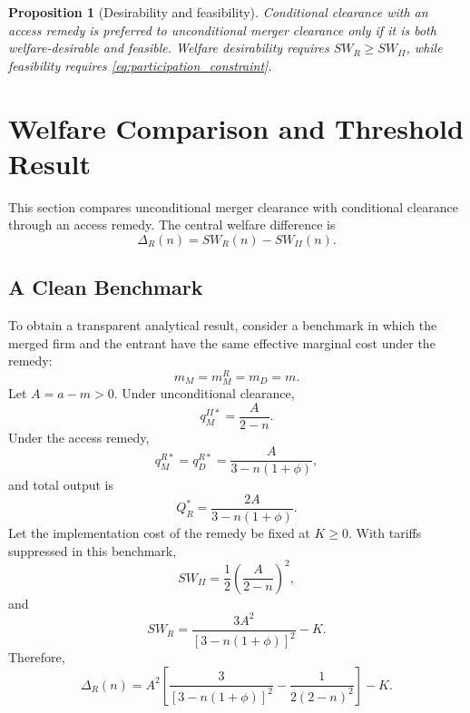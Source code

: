 \documentclass[12pt]{article}
\newtheorem{proposition}{Proposition}
\begin{document}
\begin{proposition}[Desirability and feasibility]
Conditional clearance with an access remedy is preferred to unconditional merger clearance only if it is both welfare-desirable and feasible. Welfare desirability requires $SW_R\geq SW_{II}$, while feasibility requires \eqref{eq:participation_constraint}.
\end{proposition}

\section{Welfare Comparison and Threshold Result}\label{sec:threshold}

This section compares unconditional merger clearance with conditional clearance through an access remedy. The central welfare difference is
\begin{equation}
\Delta_R(n)=SW_R(n)-SW_{II}(n).
\label{eq:Delta_definition_clean}
\end{equation}

\subsection{A Clean Benchmark}

To obtain a transparent analytical result, consider a benchmark in which the merged firm and the entrant have the same effective marginal cost under the remedy:
\begin{equation}
m_M=m_M^R=m_D=m.
\end{equation}
Let $A=a-m>0$. Under unconditional clearance,
\begin{equation}
q_M^{II*}=\frac{A}{2-n}.
\label{eq:qII_clean_benchmark}
\end{equation}
Under the access remedy,
\begin{equation}
q_M^{R*}=q_D^{R*}=\frac{A}{3-n(1+\phi)},
\label{eq:qR_clean_benchmark}
\end{equation}
and total output is
\begin{equation}
Q_R^*=\frac{2A}{3-n(1+\phi)}.
\end{equation}
Let the implementation cost of the remedy be fixed at $K\geq0$. With tariffs suppressed in this benchmark,
\begin{equation}
SW_{II}=\frac{1}{2}\left(\frac{A}{2-n}\right)^2,
\end{equation}
and
\begin{equation}
SW_R=\frac{3A^2}{[3-n(1+\phi)]^2}-K.
\end{equation}
Therefore,
\begin{equation}
\Delta_R(n)=A^2\left[\frac{3}{[3-n(1+\phi)]^2}-\frac{1}{2(2-n)^2}\right]-K.
\label{eq:Delta_clean_benchmark}
\end{equation}
\end{document}
